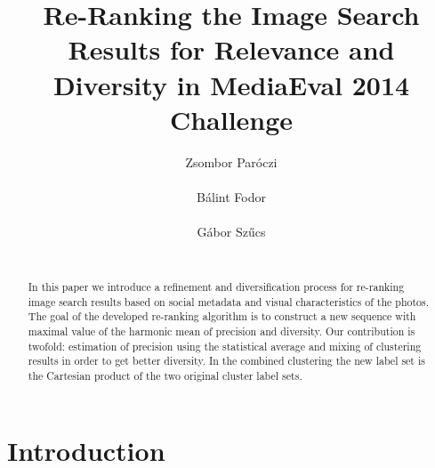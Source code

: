 \documentclass{acm_proc_article-me}
\begin{document}

\title{Re-Ranking the Image Search Results for Relevance and Diversity in MediaEval 2014 Challenge}


\author{
\alignauthor
Zsombor Par\'oczi\\
       \\
\alignauthor
B\'alint Fodor\\
       \\
\alignauthor
G\'abor Sz\H ucs \\
       \\
}

\maketitle
\begin{abstract}

In this paper we introduce a refinement and diversification process for re-ranking image search results based on social metadata and visual characteristics of the photos.
The goal of the developed re-ranking algorithm is to construct a new sequence with maximal
value of the harmonic mean of precision and diversity. Our contribution is twofold: estimation of precision using the statistical average and mixing of clustering results in order to get better diversity. In the combined clustering the new label set is the Cartesian product of the two original cluster label sets.

\end{abstract}

\section{Introduction}
\end{document}
